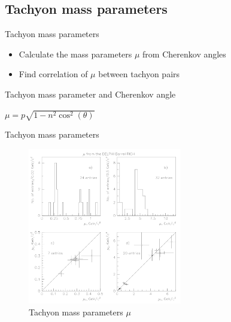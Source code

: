 \documentclass{beamer}
\begin{document}
\subsection{Tachyon mass parameters}
\begin{frame}{Tachyon mass parameters}
  \begin{itemize}
    \setlength\itemsep{2.0em}
    \item{Calculate the mass parameters $\mu$ from Cherenkov angles}
    \item{Find correlation of $\mu$ between tachyon pairs}
  \end{itemize}
  \vspace{1cm}
  \begin{block}{Tachyon mass parameter and Cherenkov angle}
    \begin{center}
      \vspace{0.3cm}
      $\mu = p\sqrt{1 - n^2\cos^2(\theta)}$
      \vspace{0.3cm}
    \end{center}
  \end{block}
\end{frame}

\begin{frame}{Tachyon mass parameters}
  \begin{figure}
    \centering
    \includegraphics[width = 0.6\textwidth]{MassParameters.png}
    \caption{Tachyon mass parameters $\mu$}
  \end{figure}
\end{frame}
\end{document}

